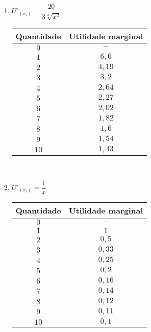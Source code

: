 \documentclass[a4paper, 12pt]{article}
\begin{document}
\begin{enumerate}
\begin{enumerate}
		\item $U'_{(x_1)} = \dfrac{20}{3 \sqrt[3]{x^2}}$\\
		\begin{table}[H]
			\begin{tabular}{|c|c|}
				\hline
				Quantidade & Utilidade marginal \\ \hline
				$0$ & $-$\\ \hline
				$1$ & $6,6$\\ \hline
				$2$ & $4,19$\\ \hline
				$3$ & $3,2$\\ \hline
				$4$ & $2,64$\\ \hline
				$5$ & $2,27$\\ \hline
				$6$ & $2,02$\\ \hline
				$7$ & $1,82$\\ \hline
				$8$ & $1,6$\\ \hline
				$9$ & $1,54$\\ \hline
				$10$ & $1,43$\\ \hline
			\end{tabular}
		\end{table}\\
		\newpage
		
		\item $U'_{(x_1)} = \dfrac{1}{x}$\\
		\begin{table}[H]
			\begin{tabular}{|c|c|}
				\hline
				Quantidade & Utilidade marginal \\ \hline
				$0$ & $-$\\ \hline
				$1$ & $1$\\ \hline
				$2$ & $0,5$\\ \hline
				$3$ & $0,33$\\ \hline
				$4$ & $0,25$\\ \hline
				$5$ & $0,2$\\ \hline
				$6$ & $0,16$\\ \hline
				$7$ & $0,14$\\ \hline
				$8$ & $0,12$\\ \hline
				$9$ & $0,11$\\ \hline
				$10$ & $0,1$\\ \hline
			\end{tabular}
		\end{table}\\
	

\end{enumerate}
\end{enumerate}
\end{document}
